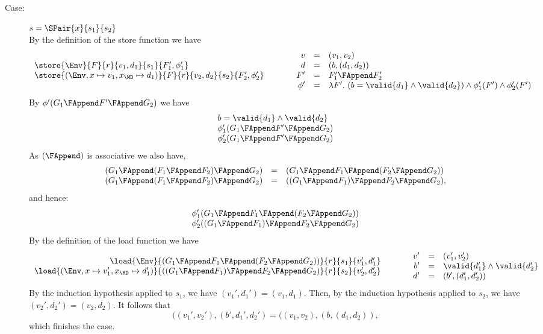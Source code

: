 {\begin{description}
\item[Case:] $s = \SPair{x}{s_1}{s_2}$\\[1ex]
%
By the definition of the store function we have
\[
\begin{array}{l}
\store{\Env}{F}{r}{v_1,d_1}{s_1}{F_1',\phi_1'}\\
\store{(\Env, x \mapsto v_1, x_{\MD} \mapsto d_1)}{F}{r}{v_2,d_2}{s_2}{F_2',\phi_2'}\\
\end{array}\hspace*{1cm}\begin{array}{rcl}
v &=& (v_1,v_2)\\
d &=& (b,(d_1,d_2))\\
F' &=& F_1' \FAppend F_2'\\
\phi' &=& \lambda F'.~(b = \valid{d_1} \wedge \valid{d_2}) \wedge \phi_1'(F') \wedge \phi_2'(F')\\
\end{array}
\]
By $\phi'(G_1 \FAppend F' \FAppend G_2)$ we have
\[
\begin{array}{l}
b = \valid{d_1} \wedge \valid{d_2}\\
\phi_1'(G_1 \FAppend F' \FAppend G_2)\\
\phi_2'(G_1 \FAppend F' \FAppend G_2)\\
\end{array}
\]
%
As $(\FAppend)$ is associative we also have,
\[
\begin{array}{rcl}
(G_1\FAppend (F_1\FAppend F_2)\FAppend G_2) &=& (G_1\FAppend F_1\FAppend (F_2\FAppend G_2))\\
(G_1\FAppend (F_1\FAppend F_2)\FAppend G_2) &=& ((G_1\FAppend F_1)\FAppend F_2\FAppend G_2),\\
\end{array}
\]
and hence:
\[
\begin{array}{l}
\phi_1'(G_1\FAppend F_1\FAppend (F_2\FAppend G_2))\\
\phi_2'((G_1\FAppend F_1)\FAppend F_2\FAppend G_2)\\
\end{array}
\]
By the definition of the load function we have 
\[ 
\begin{array}{rcll}
\load{\Env}{(G_1 \FAppend F_1 \FAppend (F_2 \FAppend G_2))}{r}{s_1}{v_1',d_1'}\\
\load{(\Env, x \mapsto v_1', x_{\MD} \mapsto d_1')}{((G_1 \FAppend F_1) \FAppend F_2 \FAppend G_2)}{r}{s_2}{v_2',d_2'}\\
\end{array}\hspace*{1cm}\begin{array}{rcl}
v' &=& (v_1',v_2')\\
b' &= & \valid{d_1'} \wedge \valid{d_2'}\\
d' &=& (b',(d_1',d_2'))\\
\end{array}
\]
%
By the induction hypothesis applied to $s_1$, we have $(v_1',d_1') =
(v_1,d_1)$.  Then, by the induction hypothesis applied to $s_2$, we
have $(v_2',d_2') = (v_2,d_2)$.  It follows that
%
\[
((v_1',v_2'), (b',d_1',d_2') = ((v_1,v_2), (b, (d_1,d_2)),
\]
%
which finishes the case. 


\end{description}}

